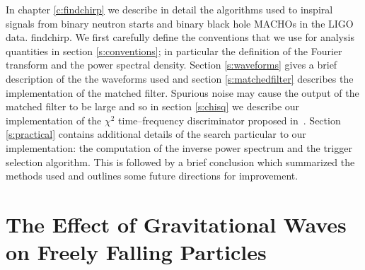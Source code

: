 
In chapter \ref{c:findchirp} we describe in detail the algorithms used to
inspiral signals from binary neutron starts and binary black hole MACHOs in
the LIGO data.  findchirp. We first carefully define the conventions that we
use for analysis quantities in section \ref{s:conventions}; in particular the
definition of the Fourier transform and the power spectral density. Section
\ref{s:waveforms} gives a brief description of the the waveforms used and
section \ref{s:matchedfilter} describes the implementation of the matched
filter.  Spurious noise may cause the output of the matched filter to be large
and so in section \ref{s:chisq} we describe our implementation of the $\chi^2$
time--frequency discriminator proposed in~\cite{allen}. Section
\ref{s:practical} contains additional details of the search particular to our
implementation: the computation of the inverse power spectrum and the trigger
selection algorithm. This is followed by a brief conclusion which summarized
the methods used and outlines some future directions for improvement.



\section{The Effect of Gravitational Waves on Freely Falling Particles}

